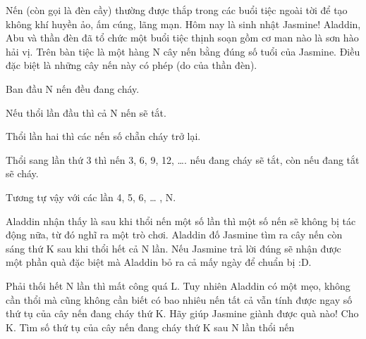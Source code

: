 Nến (còn gọi là đèn cầy) thường được thắp trong các buổi tiệc ngoài tời để tạo không khí huyền ảo, ấm cúng, lãng mạn. Hôm nay là sinh nhật Jasmine! Aladdin, Abu và thần đèn đã tổ chức một buổi tiệc thịnh soạn gồm cơ man nào là sơn hào hải vị. Trên bàn tiệc là một hàng N cây nến bằng đúng số tuổi của Jasmine. Điều đặc biệt là những cây nến này có phép (do của thần đèn).

Ban đầu N nến đều đang cháy.

Nếu thổi lần đầu thì cả N nến sẽ tắt.

Thổi lần hai thì các nến số chẵn cháy trở lại.

Thổi sang lần thứ 3 thì nến 3, 6, 9, 12, …. nếu đang cháy sẽ tắt, còn nếu đang tắt sẽ cháy.

Tương tự vậy với các lần 4, 5, 6, … , N.

Aladdin nhận thấy là sau khi thổi nến một số lần thì một số nến sẽ không bị tác động nữa, từ đó nghĩ ra một trò chơi. Aladdin đố Jasmine tìm ra cây nến còn sáng thứ K sau khi thổi hết cả N lần. Nếu Jasmine trả lời đúng sẽ nhận được một phần quà đặc biệt mà Aladdin bỏ ra cả mấy ngày để chuẩn bị :D.

Phải thối hết N lần thì mất công quá L. Tuy nhiên Aladdin có một mẹo, không cần thổi mà cũng không cần biết có bao nhiêu nến tất cả vẫn tính được ngay số thứ tụ của cây nến đang cháy thứ K. Hãy giúp Jasmine giành được quà nào!
Cho K. Tìm số thứ tụ của cây nến đang cháy thứ K sau N lần thổi nến